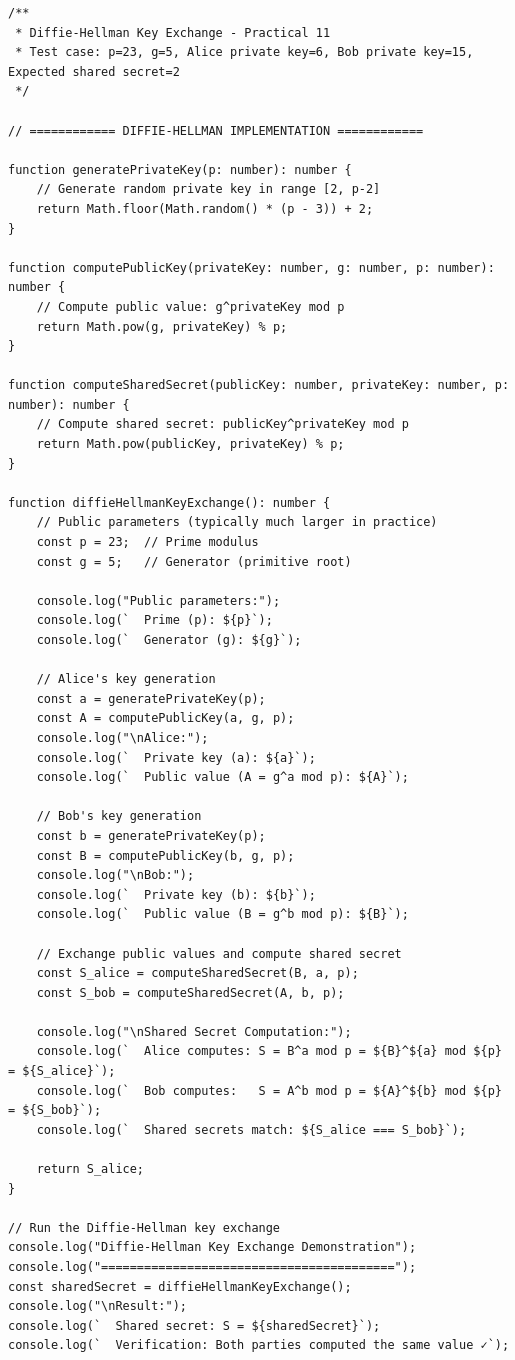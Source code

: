 \documentclass[a4paper,12pt]{article}
\begin{document}
\begin{verbatim}
/**
 * Diffie-Hellman Key Exchange - Practical 11
 * Test case: p=23, g=5, Alice private key=6, Bob private key=15, Expected shared secret=2
 */

// ============ DIFFIE-HELLMAN IMPLEMENTATION ============

function generatePrivateKey(p: number): number {
    // Generate random private key in range [2, p-2]
    return Math.floor(Math.random() * (p - 3)) + 2;
}

function computePublicKey(privateKey: number, g: number, p: number): number {
    // Compute public value: g^privateKey mod p
    return Math.pow(g, privateKey) % p;
}

function computeSharedSecret(publicKey: number, privateKey: number, p: number): number {
    // Compute shared secret: publicKey^privateKey mod p
    return Math.pow(publicKey, privateKey) % p;
}

function diffieHellmanKeyExchange(): number {
    // Public parameters (typically much larger in practice)
    const p = 23;  // Prime modulus
    const g = 5;   // Generator (primitive root)

    console.log("Public parameters:");
    console.log(`  Prime (p): ${p}`);
    console.log(`  Generator (g): ${g}`);

    // Alice's key generation
    const a = generatePrivateKey(p);
    const A = computePublicKey(a, g, p);
    console.log("\nAlice:");
    console.log(`  Private key (a): ${a}`);
    console.log(`  Public value (A = g^a mod p): ${A}`);

    // Bob's key generation
    const b = generatePrivateKey(p);
    const B = computePublicKey(b, g, p);
    console.log("\nBob:");
    console.log(`  Private key (b): ${b}`);
    console.log(`  Public value (B = g^b mod p): ${B}`);

    // Exchange public values and compute shared secret
    const S_alice = computeSharedSecret(B, a, p);
    const S_bob = computeSharedSecret(A, b, p);

    console.log("\nShared Secret Computation:");
    console.log(`  Alice computes: S = B^a mod p = ${B}^${a} mod ${p} = ${S_alice}`);
    console.log(`  Bob computes:   S = A^b mod p = ${A}^${b} mod ${p} = ${S_bob}`);
    console.log(`  Shared secrets match: ${S_alice === S_bob}`);

    return S_alice;
}

// Run the Diffie-Hellman key exchange
console.log("Diffie-Hellman Key Exchange Demonstration");
console.log("=========================================");
const sharedSecret = diffieHellmanKeyExchange();
console.log("\nResult:");
console.log(`  Shared secret: S = ${sharedSecret}`);
console.log(`  Verification: Both parties computed the same value ✓`);


\end{verbatim}
\end{document}
